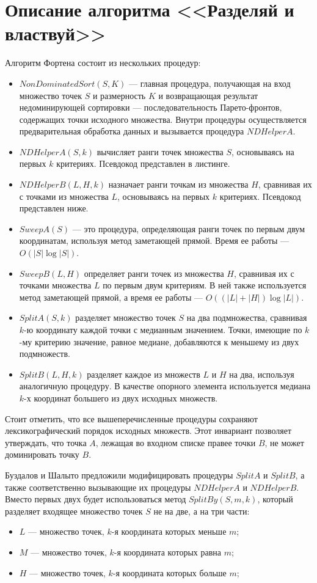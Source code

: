 \section{Описание алгоритма <<Разделяй и властвуй>>}
Алгоритм Фортена состоит из нескольких процедур:
\begin{itemize}
    \item $NonDominatedSort(S, K)$ --- главная процедура, получающая на вход множество точек $S$ и размерность $K$ и возвращающая результат недоминирующей сортировки --- последовательность Парето-фронтов, содержащих точки исходного множества. Внутри процедуры осуществляется предварительная обработка данных и вызывается процедура $NDHelperA$.
    \item $NDHelperA(S, k)$ вычисляет ранги точек множества $S$, основываясь на первых $k$ критериях. Псевдокод представлен в листинге.
    \item $NDHelperB(L, H, k)$ назначает ранги точкам из множества $H$, сравнивая их с точками из множества $L$, основываясь на первых $k$ критериях. Псевдокод представлен ниже.
    \item $SweepA(S)$ --- это процедура, определяющая ранги точек по первым двум координатам, используя метод заметающей прямой. Время ее работы --- $O(|S|\log|S|)$.
    \item $SweepB(L, H)$ определяет ранги точек из множества $H$, сравнивая их с точками множества $L$ по первым двум критериям. В ней также используется метод заметающей прямой, а время ее работы --- $O((|L| + |H|)\log{|L|})$.
    \item $SplitA(S, k)$ разделяет множество точек $S$ на два подмножества, сравнивая $k$-ю координату каждой точки с медианным значением. Точки, имеющие по $k$-му критерию значение, равное медиане, добавляются к меньшему из двух подмножеств.
    \item $SplitB(L, H, k)$ разделяет каждое из множеств $L$ и $H$ на два, используя аналогичную процедуру. В качестве опорного элемента используется медиана $k$-х координат большего из двух исходных множеств.
\end{itemize}

Стоит отметить, что все вышеперечисленные процедуры сохраняют лексикографический порядок исходных множеств.
Этот инвариант позволяет утверждать, что точка $A$, лежащая во входном списке правее точки $B$, не может доминировать точку $B$.

Буздалов и Шалыто предложили модифицировать процедуры $SplitA$ и $SplitB$, а также соответственно вызывающие их процедуры $NDHelperA$ и $NDHelperB$. Вместо первых двух будет использоваться метод $SplitBy(S, m, k)$, который разделяет входящее множество точек $S$ не на две, а на три части:
\begin{itemize}
    \item $L$ --- множество точек, $k$-я координата которых меньше $m$;
    \item $M$ --- множество точек, $k$-я координата которых равна $m$;
    \item $H$ --- множество точек, $k$-я координата которых больше $m$;
\end{itemize}

